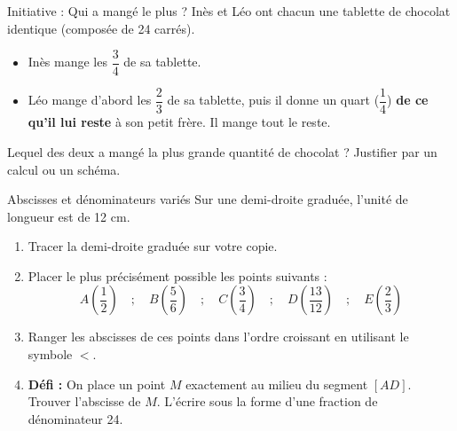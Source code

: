 \documentclass[a4paper]{book}
\begin{document}
    \vspace{0.5cm}
    
    \begin{exerciceTitre}{Initiative : Qui a mangé le plus ?}
        Inès et Léo ont chacun une tablette de chocolat identique (composée de 24 carrés).
        \begin{itemize}
            \item Inès mange les $\dfrac{3}{4}$ de sa tablette.
            \item Léo mange d'abord les $\dfrac{2}{3}$ de sa tablette, puis il donne un quart ($\dfrac{1}{4}$) \textbf{de ce qu'il lui reste} à son petit frère. Il mange tout le reste.
        \end{itemize}
        Lequel des deux a mangé la plus grande quantité de chocolat ? Justifier par un calcul ou un schéma.
    \end{exerciceTitre}

    \vspace{0.5cm}
    
    \begin{exerciceTitre}{Abscisses et dénominateurs variés}
        Sur une demi-droite graduée, l'unité de longueur est de 12 cm. 
        
        \begin{enumerate}
            \item Tracer la demi-droite graduée sur votre copie.
            \item Placer le plus précisément possible les points suivants : 
            \[ A\left(\dfrac{1}{2}\right) \quad ; \quad B\left(\dfrac{5}{6}\right) \quad ; \quad C\left(\dfrac{3}{4}\right) \quad ; \quad D\left(\dfrac{13}{12}\right) \quad ; \quad E\left(\dfrac{2}{3}\right) \]
            \item Ranger les abscisses de ces points dans l'ordre croissant en utilisant le symbole $<$.
            \item \textbf{Défi :} On place un point $M$ exactement au milieu du segment $[AD]$. Trouver l'abscisse de $M$. L'écrire sous la forme d'une fraction de dénominateur 24.
        \end{enumerate}
    \end{exerciceTitre}
\end{document}
